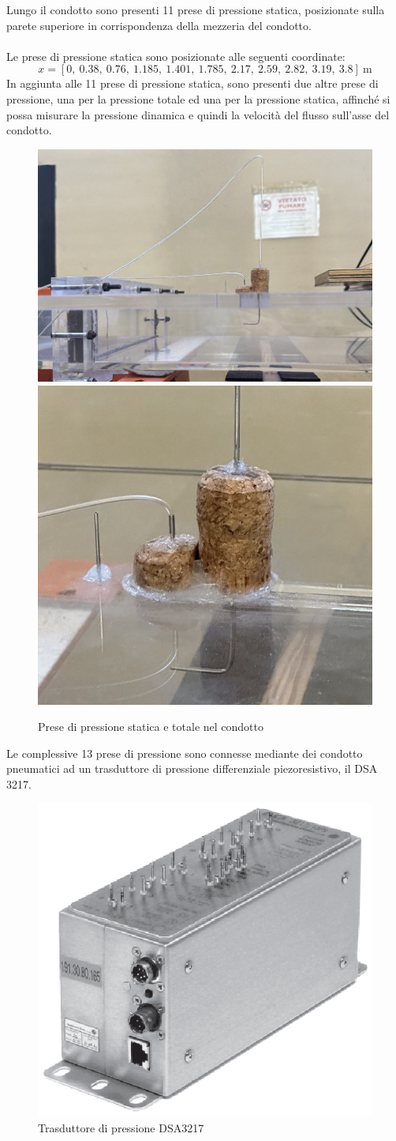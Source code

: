 \noindent Lungo il condotto sono presenti 11 prese di pressione statica, posizionate sulla parete superiore in corrispondenza della mezzeria del condotto.\\\\
Le prese di pressione statica sono posizionate alle seguenti coordinate:
\begin{equation*}
    x = [0,\ 0.38,\ 0.76,\ 1.185,\ 1.401,\ 1.785,\ 2.17,\ 2.59,\ 2.82,\ 3.19,\ 3.8]\ \text{m}
\end{equation*}
In aggiunta alle 11 prese di pressione statica, sono presenti due altre prese di pressione, una per la pressione totale ed una per la pressione statica, affinché si possa misurare la pressione dinamica e quindi la velocità del flusso sull'asse del condotto.
\begin{figure}[H]
    \centering
    \includegraphics[width=.55\textwidth]{images/7/prese.jpg}
    \includegraphics[width=.401\textwidth]{images/7/sughero.jpg}
    \caption{Prese di pressione statica e totale nel condotto}
\end{figure}

\noindent Le complessive 13 prese di pressione sono connesse mediante dei condotto pneumatici ad un trasduttore di pressione differenziale piezoresistivo, il DSA 3217.
\begin{figure}[H]
    \centering
    \includegraphics[width=.35\textwidth]{images/7/trasduttore.png}
    \caption{Trasduttore di pressione DSA3217}
\end{figure}

